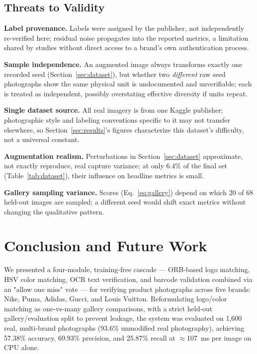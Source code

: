 \documentclass[conference]{IEEEtran}
\begin{document}
\subsection{Threats to Validity}
\label{sec:threats}

\textbf{Label provenance.} Labels were assigned by the publisher, not
independently re-verified here; residual noise propagates into the
reported metrics, a limitation shared by studies without direct access
to a brand's own authentication process.

\textbf{Sample independence.} An augmented image always transforms
exactly one recorded seed (Section~\ref{sec:dataset}), but whether two
\emph{different} raw seed photographs show the same physical unit is
undocumented and unverifiable; each is treated as independent, possibly
overstating effective diversity if units repeat.

\textbf{Single dataset source.} All real imagery is from one Kaggle
publisher; photographic style and labeling conventions specific to it
may not transfer elsewhere, so Section~\ref{sec:results}'s figures
characterize this dataset's difficulty, not a universal constant.

\textbf{Augmentation realism.} Perturbations in Section~\ref{sec:dataset}
approximate, not exactly reproduce, real capture variance; at only 6.4\%
of the final set (Table~\ref{tab:dataset}), their influence on headline
metrics is small.

\textbf{Gallery sampling variance.} Scores (Eq.~\eqref{eq:gallery})
depend on which 20 of 68 held-out images are sampled; a different seed
would shift exact metrics without changing the qualitative pattern.

\section{Conclusion and Future Work}
\label{sec:conclusion}

We presented a four-module, training-free cascade --- ORB-based logo
matching, HSV color matching, OCR text verification, and barcode
validation combined via an "allow one miss" vote --- for verifying
product photographs across five brands: Nike, Puma, Adidas, Gucci, and
Louis Vuitton. Reformulating logo/color matching as one-vs-many gallery
comparisons, with a strict held-out gallery/evaluation split to prevent
leakage, the system was evaluated on 1{,}600 real, multi-brand
photographs (93.6\% unmodified real photography), achieving 57.38\%
accuracy, 69.93\% precision, and 25.87\% recall at $\approx$107~ms per
image on CPU alone.
\end{document}
